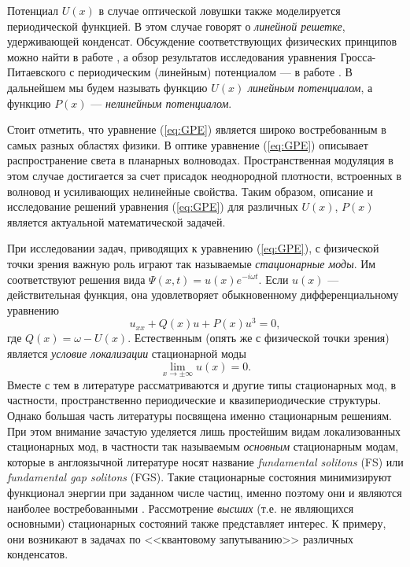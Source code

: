 Потенциал $U(x)$ в случае оптической ловушки также моделируется периодической функцией.
В этом случае говорят о {\it линейной решетке}, удерживающей конденсат.
Обсуждение соответствующих физических принципов можно найти в работе \cite{Pitaevskii}, а обзор результатов исследования уравнения Гросса-Питаевского с периодическим (линейным) потенциалом --- в работе \citep{Brazhnyi}.
В дальнейшем мы будем называть функцию $U(x)$ {\it линейным потенциалом}, а функцию $P(x)$ --- {\it нелинейным потенциалом}.

Стоит отметить, что уравнение (\ref{eq:GPE}) является широко востребованным в самых разных областях физики.
В оптике уравнение (\ref{eq:GPE}) описывает распространение света в планарных волноводах.
Пространственная модуляция в этом случае достигается за счет присадок неоднородной плотности, встроенных в волновод и усиливающих нелинейные свойства.
Таким образом, описание и исследование решений уравнения (\ref{eq:GPE}) для различных $U(x)$, $P(x)$ является актуальной математической задачей.

При исследовании задач, приводящих к уравнению (\ref{eq:GPE}), с физической точки зрения важную роль играют так называемые {\it стационарные моды}.
Им соответствуют решения вида $\Psi(x, t) = u(x) e^{-i \omega t}$.
Если $u(x)$ --- действительная функция, она удовлетворяет обыкновенному дифференциальному уравнению
%
\begin{equation}
u_{xx} + Q(x)u + P(x)u^3 = 0,
\label{eq:stationary}
\end{equation}
%
где $Q(x) = \omega - U(x)$.
Естественным (опять же с физической точки зрения) является {\it условие локализации} стационарной моды
%
\begin{equation}
\lim \limits_{x \to \pm \infty} u(x) = 0.
\label{eq:localization}
\end{equation}
%
Вместе с тем в литературе рассматриваются и другие типы стационарных мод, в частности, пространственно периодические и квазипериодические структуры.
Однако большая часть литературы посвящена именно стационарным решениям.
При этом внимание зачастую уделяется лишь простейшим видам локализованных стационарных мод, в частности так называемым {\it основным} стационарным модам, которые в англоязычной литературе носят название {\it fundamental solitons} (FS) или {\it fundamental gap solitons} (FGS).
Такие стационарные состояния минимизируют функционал энергии при заданном числе частиц, именно поэтому они и являются наиболее востребованными \cite{Kartashov}.
Рассмотрение {\it высших} (т.е. не являющихся основными) стационарных состояний также представляет интерес.
К примеру, они возникают в задачах по <<квантовому запутыванию>> различных конденсатов.

